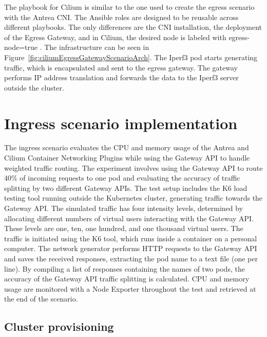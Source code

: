 The playbook for Cilium is similar to the one used to create the egress scenario with the Antrea CNI. The Ansible roles are designed to be reusable across different playbooks. The only differences are the CNI installation, the deployment of the Egress Gateway, and in Cilium, the desired node is labeled with egress-node=true \cite{CiliumEgressGateway}. The infrastructure can be seen in Figure~\ref{fig:ciliumEgressGatewayScenarioArch}. The Iperf3 pod starts generating traffic, which is encapsulated and sent to the egress gateway. The gateway performs IP address translation and forwards the data to the Iperf3 server outside the cluster.



\section{Ingress scenario implementation}
\label{sec:ingressImpl}

The ingress scenario evaluates the CPU and memory usage of the Antrea and Cilium Container Networking Plugins while using the Gateway API to handle weighted traffic routing. The experiment involves using the Gateway API to route 40\% of incoming requests to one pod and evaluating the accuracy of traffic splitting by two different Gateway APIs. The test setup includes the K6 load testing tool running outside the Kubernetes cluster, generating traffic towards the Gateway API. The simulated traffic has four intensity levels, determined by allocating different numbers of virtual users interacting with the Gateway API. These levels are one, ten, one hundred, and one thousand virtual users. The traffic is initiated using the K6 tool, which runs inside a container on a personal computer. The network generator performs HTTP requests to the Gateway API and saves the received responses, extracting the pod name to a text file (one per line). By compiling a list of responses containing the names of two pods, the accuracy of the Gateway API traffic splitting is calculated. CPU and memory usage are monitored with a Node Exporter throughout the test and retrieved at the end of the scenario.


\subsection{Cluster provisioning}
\label{sec:clusterProvisioning}

